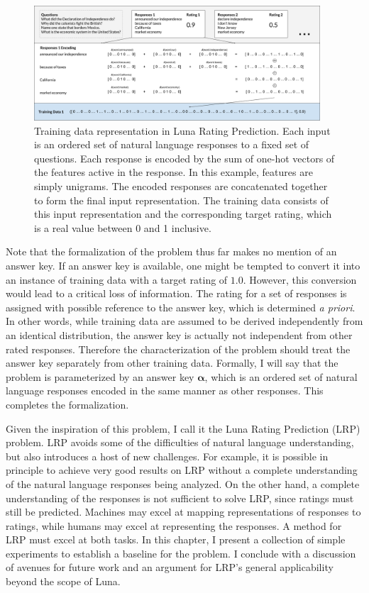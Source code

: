 \begin{figure}[h]
\centerline{%
\includegraphics[width=0.95\textwidth]{figures/lrpformalization.png}%
}%
\caption{Training data representation in Luna Rating Prediction. Each input is an ordered set of natural language responses to a fixed set of questions. Each response is encoded by the sum of one-hot vectors of the features active in the response. In this example, features are simply unigrams. The encoded responses are concatenated together to form the final input representation. The training data consists of this input representation and the corresponding target rating, which is a real value between 0 and 1 inclusive.}
\label{fig:lrpformalization}
\end{figure}

Note that the formalization of the problem thus far makes no mention of an answer key. If an answer key is available, one might be tempted to convert it into an instance of training data with a target rating of $1.0$. However, this conversion would lead to a critical loss of information. The rating for a set of responses is assigned with possible reference to the answer key, which is determined \textit{a priori}. In other words, while training data are assumed to be derived independently from an identical distribution, the answer key is actually not independent from other rated responses. Therefore the characterization of the problem should treat the answer key separately from other training data. Formally, I will say that the problem is parameterized by an answer key $\mathbf{\alpha}$, which is an ordered set of natural language responses encoded in the same manner as other responses. This completes the formalization.

Given the inspiration of this problem, I call it the Luna Rating Prediction (LRP) problem. LRP avoids some of the difficulties of natural language understanding, but also introduces a host of new challenges. For example, it is possible in principle to achieve very good results on LRP without a complete understanding of the natural language responses being analyzed. On the other hand, a complete understanding of the responses is not sufficient to solve LRP, since ratings must still be predicted. Machines may excel at mapping representations of responses to ratings, while humans may excel at representing the responses. A method for LRP must excel at both tasks. In this chapter, I present a collection of simple experiments to establish a baseline for the problem. I conclude with a discussion of avenues for future work and an argument for LRP's general applicability beyond the scope of Luna.

